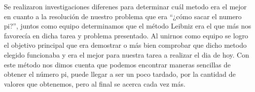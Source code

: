 \documentclass[a4paper]{article}
\begin{document}
Se realizaron investigaciones diferenes para determinar cuál metodo era el mejor en cuanto a la resolución de nuestro problema que era “¿cómo sacar el numero pi?”, juntos como equipo determinamos que el método Leibniz era el que más nos favorecía en dicha tarea y problema presentado. Al unirnos como equipo se logro el objetivo principal que era demostrar o más bien comprobar que dicho metodo elegido funcionaba y era el mejor para nuestra tarea a realizar el dia de hoy. Con este método nos dimos cuenta que podemos encontrar maneras sencillas de obtener el número pi, puede llegar a ser un poco tardado, por la cantidad de valores que obtenemos, pero al final se acerca cada vez más.



\end{document}
